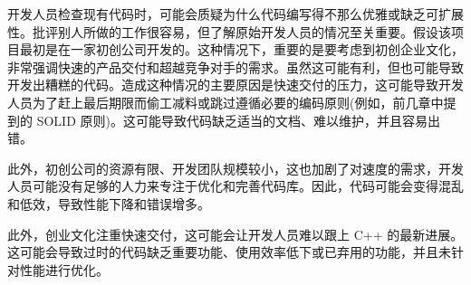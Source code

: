 开发人员检查现有代码时，可能会质疑为什么代码编写得不那么优雅或缺乏可扩展性。批评别人所做的工作很容易，但了解原始开发人员的情况至关重要。假设该项目最初是在一家初创公司开发的。这种情况下，重要的是要考虑到初创企业文化，非常强调快速的产品交付和超越竞争对手的需求。虽然这可能有利，但也可能导致开发出糟糕的代码。造成这种情况的主要原因是快速交付的压力，这可能导致开发人员为了赶上最后期限而偷工减料或跳过遵循必要的编码原则(例如，前几章中提到的 SOLID 原则)。这可能导致代码缺乏适当的文档、难以维护，并且容易出错。

此外，初创公司的资源有限、开发团队规模较小，这也加剧了对速度的需求，开发人员可能没有足够的人力来专注于优化和完善代码库。因此，代码可能会变得混乱和低效，导致性能下降和错误增多。

此外，创业文化注重快速交付，这可能会让开发人员难以跟上 C++ 的最新进展。这可能会导致过时的代码缺乏重要功能、使用效率低下或已弃用的功能，并且未针对性能进行优化。

